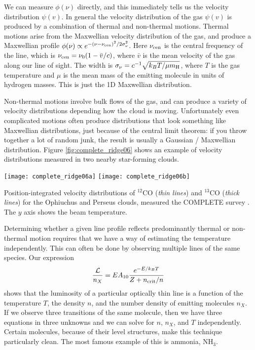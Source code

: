 We can measure $\phi(\nu)$ directly, and this immediately tells us the velocity distribution $\psi(v)$. In general the velocity distribution of the gas $\psi(v)$ is produced by a combination of thermal and non-thermal motions. Thermal motions arise from the Maxwellian velocity distribution of the gas, and produce a Maxwellian profile $\phi(\nu)\propto e^{-(\nu-\nu_{\rm cen})^2/2\sigma_\nu^2}$. Here $\nu_{\rm cen}$ is the central frequency of the line, which is $\nu_{\rm cen} = \nu_0 (1 - \bar{v}/c)$, where $\bar{v}$ is the mean velocity of the gas along our line of sight. The width is $\sigma_\nu = c^{-1}\sqrt{k_B T/\mu m_{\rm H}}$, where $T$ is the gas temperature and $\mu$ is the mean mass of the emitting molecule in units of hydrogen masses. This is just the 1D Maxwellian distribution.

Non-thermal motions involve bulk flows of the gas, and can produce a variety of velocity distributions depending how the cloud is moving. Unfortunately even complicated motions often produce distributions that look something like Maxwellian distributions, just because of the central limit theorem: if you throw together a lot of random junk, the result is usually a Gaussian / Maxwellian distribution. Figure \ref{fig:complete_ridge06} shows an example of velocity distributions measured in two nearby star-forming clouds.

\begin{marginfigure}
\texttt{[image: complete\_ridge06a]}
\texttt{[image: complete\_ridge06b]}
\caption[COMPLETE spectra of Ophiuchus and Perseus]{
\label{fig:complete_ridge06}
Position-integrated velocity distributions of $^{12}$CO (\textit{thin lines}) and $^{13}$CO (\textit{thick lines}) for the Ophiuchus and Perseus clouds, measured the COMPLETE survey \citep{ridge06a}. The $y$ axis shows the beam temperature.
}
\end{marginfigure}

Determining whether a given line profile reflects predominantly thermal or non-thermal motion requires that we have a way of estimating the temperature independently. This can often be done by observing multiple lines of the same species. Our expression
\begin{equation}
\frac{\mathcal{L}}{n_X} = E A_{10} \frac{e^{-E/k_B T}}{Z + n_{\rm crit}/n}
\end{equation}
shows that the luminosity of a particular optically thin line is a function of the temperature $T$, the density $n$, and the number density of emitting molecules $n_X$. If we observe three transitions of the same molecule, then we have three equations in three unknowns and we can solve for $n$, $n_X$, and $T$ independently. Certain molecules, because of their level structures, make this technique particularly clean. The most famous example of this is ammonia, NH$_3$.

